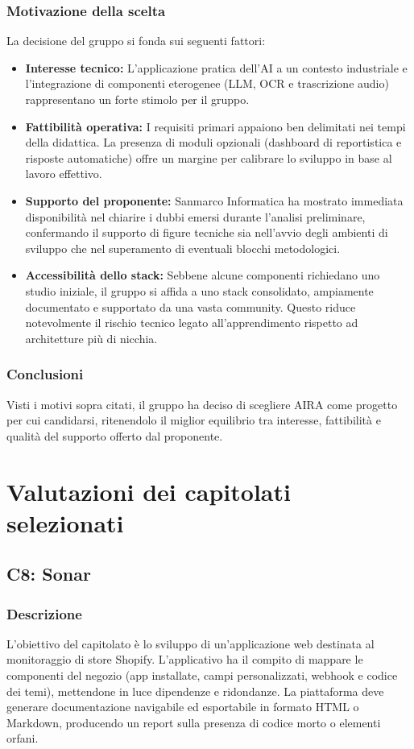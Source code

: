 \subsubsection{Motivazione della scelta}
La decisione del gruppo si fonda sui seguenti fattori:
\begin{itemize}
    \item \textbf{Interesse tecnico:} L'applicazione pratica dell'AI a un contesto industriale e l'integrazione di componenti eterogenee (LLM, OCR e trascrizione audio) rappresentano un forte stimolo per il gruppo.
    \item \textbf{Fattibilità operativa:} I requisiti primari appaiono ben delimitati nei tempi della didattica. La presenza di moduli opzionali (dashboard di reportistica e risposte automatiche) offre un margine per calibrare lo sviluppo in base al lavoro effettivo.
    \item \textbf{Supporto del proponente:} Sanmarco Informatica ha mostrato immediata disponibilità nel chiarire i dubbi emersi durante l'analisi preliminare, confermando il supporto di figure tecniche sia nell'avvio degli ambienti di sviluppo che nel superamento di eventuali blocchi metodologici.
    \item \textbf{Accessibilità dello stack:} Sebbene alcune componenti richiedano uno studio iniziale, il gruppo si affida a uno stack consolidato, ampiamente documentato e supportato da una vasta community. Questo riduce notevolmente il rischio tecnico legato all'apprendimento rispetto ad architetture più di nicchia.
\end{itemize}

\subsubsection{Conclusioni}
Visti i motivi sopra citati, il gruppo ha deciso di scegliere AIRA come progetto per cui candidarsi, ritenendolo il miglior equilibrio tra interesse, fattibilità e qualità del supporto offerto dal proponente.

\section{Valutazioni dei capitolati selezionati}

\subsection{C8: Sonar}

\subsubsection{Descrizione}
L'obiettivo del capitolato è lo sviluppo di un'applicazione web destinata al monitoraggio di store Shopify. L'applicativo ha il compito di mappare le componenti del negozio (app installate, campi personalizzati, webhook e codice dei temi), mettendone in luce dipendenze e ridondanze. La piattaforma deve generare documentazione navigabile ed esportabile in formato HTML o Markdown, producendo un report sulla presenza di codice morto o elementi orfani.

